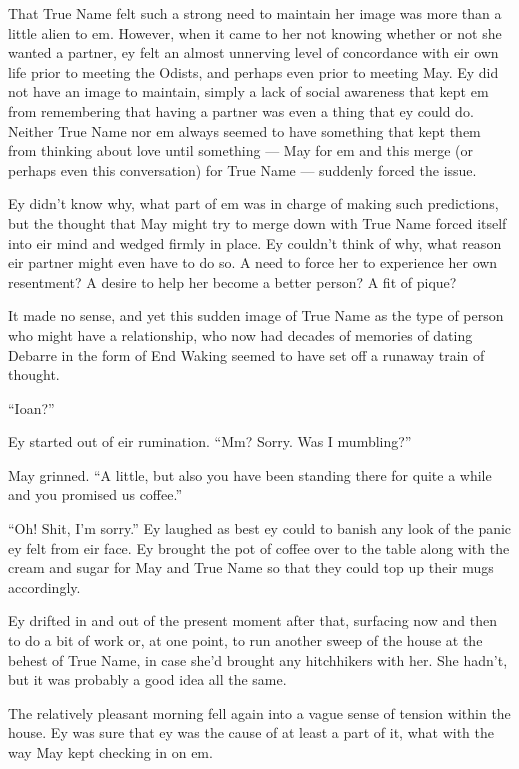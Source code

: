 That True Name felt such a strong need to maintain her image was more than a little alien to em. However, when it came to her not knowing whether or not she wanted a partner, ey felt an almost unnerving level of concordance with eir own life prior to meeting the Odists, and perhaps even prior to meeting May. Ey did not have an image to maintain, simply a lack of social awareness that kept em from remembering that having a partner was even a thing that ey could do. Neither True Name nor em always seemed to have something that kept them from thinking about love until something — May for em and this merge (or perhaps even this conversation) for True Name — suddenly forced the issue.

Ey didn't know why, what part of em was in charge of making such predictions, but the thought that May might try to merge down with True Name forced itself into eir mind and wedged firmly in place. Ey couldn't think of why, what reason eir partner might even have to do so. A need to force her to experience her own resentment? A desire to help her become a better person? A fit of pique?

It made no sense, and yet this sudden image of True Name as the type of person who might have a relationship, who now had decades of memories of dating Debarre in the form of End Waking seemed to have set off a runaway train of thought.

``Ioan?''

Ey started out of eir rumination. ``Mm? Sorry. Was I mumbling?''

May grinned. ``A little, but also you have been standing there for quite a while and you promised us coffee.''

``Oh! Shit, I'm sorry.'' Ey laughed as best ey could to banish any look of the panic ey felt from eir face. Ey brought the pot of coffee over to the table along with the cream and sugar for May and True Name so that they could top up their mugs accordingly.

Ey drifted in and out of the present moment after that, surfacing now and then to do a bit of work or, at one point, to run another sweep of the house at the behest of True Name, in case she'd brought any hitchhikers with her. She hadn't, but it was probably a good idea all the same.

The relatively pleasant morning fell again into a vague sense of tension within the house. Ey was sure that ey was the cause of at least a part of it, what with the way May kept checking in on em.

